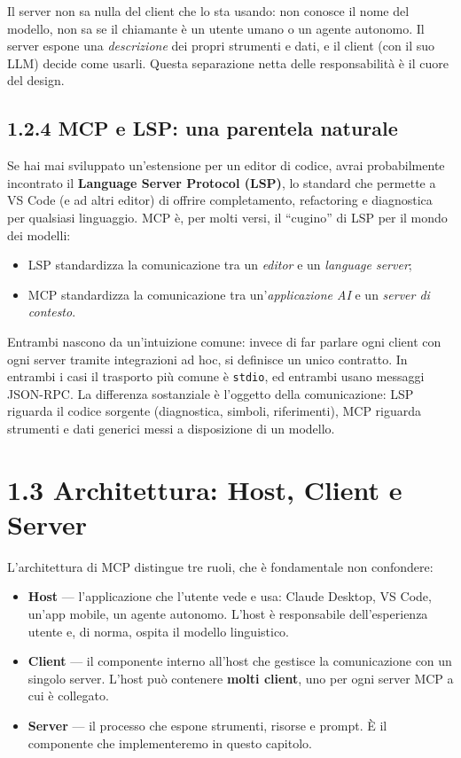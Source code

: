 \documentclass[
  italian,
  10pt,
]{book}
\providecommand{\tightlist}{%
  \setlength{\itemsep}{0pt}\setlength{\parskip}{0pt}}
\begin{document}
Il server non sa nulla del client che lo sta usando: non conosce il nome
del modello, non sa se il chiamante è un utente umano o un agente
autonomo. Il server espone una \emph{descrizione} dei propri strumenti e
dati, e il client (con il suo LLM) decide come usarli. Questa
separazione netta delle responsabilità è il cuore del design.

\subsection{1.2.4 MCP e LSP: una parentela
naturale}\label{mcp-e-lsp-una-parentela-naturale}

Se hai mai sviluppato un'estensione per un editor di codice, avrai
probabilmente incontrato il \textbf{Language Server Protocol (LSP)}, lo
standard che permette a VS Code (e ad altri editor) di offrire
completamento, refactoring e diagnostica per qualsiasi linguaggio. MCP
è, per molti versi, il ``cugino'' di LSP per il mondo dei modelli:

\begin{itemize}
\tightlist
\item
  LSP standardizza la comunicazione tra un \emph{editor} e un
  \emph{language server};
\item
  MCP standardizza la comunicazione tra un'\emph{applicazione AI} e un
  \emph{server di contesto}.
\end{itemize}

Entrambi nascono da un'intuizione comune: invece di far parlare ogni
client con ogni server tramite integrazioni ad hoc, si definisce un
unico contratto. In entrambi i casi il trasporto più comune è
\texttt{stdio}, ed entrambi usano messaggi JSON-RPC. La differenza
sostanziale è l'oggetto della comunicazione: LSP riguarda il codice
sorgente (diagnostica, simboli, riferimenti), MCP riguarda strumenti e
dati generici messi a disposizione di un modello.

\section{1.3 Architettura: Host, Client e
Server}\label{architettura-host-client-e-server}

L'architettura di MCP distingue tre ruoli, che è fondamentale non
confondere:

\begin{itemize}
\tightlist
\item
  \textbf{Host} --- l'applicazione che l'utente vede e usa: Claude
  Desktop, VS Code, un'app mobile, un agente autonomo. L'host è
  responsabile dell'esperienza utente e, di norma, ospita il modello
  linguistico.
\item
  \textbf{Client} --- il componente interno all'host che gestisce la
  comunicazione con un singolo server. L'host può contenere
  \textbf{molti client}, uno per ogni server MCP a cui è collegato.
\item
  \textbf{Server} --- il processo che espone strumenti, risorse e
  prompt. È il componente che implementeremo in questo capitolo.
\end{itemize}
\end{document}
